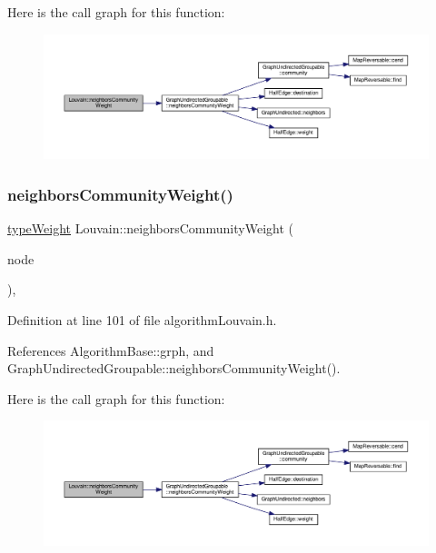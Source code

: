 Here is the call graph for this function\+:
\nopagebreak
\begin{figure}[H]
\begin{center}
\leavevmode
\includegraphics[width=350pt]{classLouvain_a6e53ceb9865522beede2212de660f42c_cgraph}
\end{center}
\end{figure}
\mbox{\label{classLouvain_a018414ffde9495cf575518702408669f}} 
\subsubsection{\texorpdfstring{neighbors\+Community\+Weight()}{neighborsCommunityWeight()}\hspace{0.1cm}{\footnotesize\ttfamily [2/2]}}
{\footnotesize\ttfamily \hyperlink{edge_8h_a2e7ea3be891ac8b52f749ec73fee6dd2}{type\+Weight} Louvain\+::neighbors\+Community\+Weight (\begin{DoxyParamCaption}\item[{const \hyperlink{edge_8h_a5fbd20c46956d479cb10afc9855223f6}{type\+Vertex} \&}]{node }\end{DoxyParamCaption})\hspace{0.3cm}{\ttfamily [inline]}, {\ttfamily [private]}}



Definition at line 101 of file algorithm\+Louvain.\+h.



References Algorithm\+Base\+::grph, and Graph\+Undirected\+Groupable\+::neighbors\+Community\+Weight().

Here is the call graph for this function\+:
\nopagebreak
\begin{figure}[H]
\begin{center}
\leavevmode
\includegraphics[width=350pt]{classLouvain_a018414ffde9495cf575518702408669f_cgraph}
\end{center}
\end{figure}
\mbox{\label{classLouvain_a6908d96331a9294d01d88ea97a405508}} 
